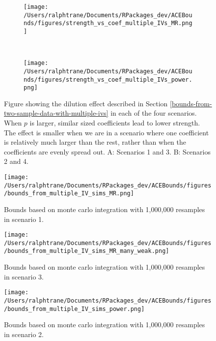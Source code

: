 \documentclass[
]{article}
\theoremstyle{plain}
\begin{document}
\begin{figure*}
  \centering
  \begin{subfigure}{0.5\linewidth}
  \caption{}
  \texttt{[image: /Users/ralphtrane/Documents/RPackages\_dev/ACEBounds/figures/strength\_vs\_coef\_multiple\_IVs\_MR.png]}
  \label{fig:strength_vs_coef_multiple_IVs_MR}
  \end{subfigure}%
  ~
  \begin{subfigure}{0.5\linewidth}
  \caption{}
  \texttt{[image: /Users/ralphtrane/Documents/RPackages\_dev/ACEBounds/figures/strength\_vs\_coef\_multiple\_IVs\_power.png]}
  \label{fig:strength_vs_coef_multiple_IVs_power}
  \end{subfigure}
  \caption{Figure showing the dilution effect described in Section \ref{bounds-from-two-sample-data-with-multiple-ivs} in each of the four scenarios. When $p$ is larger, similar sized coefficients lead to lower strength. The effect is smaller when we are in a scenario where one coefficient is relatively much larger than the rest, rather than when the coefficients are evenly spread out. A: Scenarios 1 and 3. B: Scenarios 2 and 4.}
  \label{fig:strength_vs_coef_multiple_IVs}
\end{figure*}

\clearpage

\begin{sidewaysfigure}
  \centering
  \texttt{[image: /Users/ralphtrane/Documents/RPackages\_dev/ACEBounds/figures/bounds\_from\_multiple\_IV\_sims\_MR.png]}
  \caption{Bounds based on monte carlo integration with 1,000,000 resamples in scenario 1.}
  \label{fig:bounds_from_multiple_IV_sims_MR}
\end{sidewaysfigure}

\clearpage

\begin{sidewaysfigure}
  \centering
  \texttt{[image: /Users/ralphtrane/Documents/RPackages\_dev/ACEBounds/figures/bounds\_from\_multiple\_IV\_sims\_MR\_many\_weak.png]}
  \caption{Bounds based on monte carlo integration with 1,000,000 resamples in scenario 3.}
  \label{fig:bounds_from_multiple_IV_sims_MR_many_weak}
\end{sidewaysfigure}

\clearpage

\begin{sidewaysfigure}
  \centering
  \texttt{[image: /Users/ralphtrane/Documents/RPackages\_dev/ACEBounds/figures/bounds\_from\_multiple\_IV\_sims\_power.png]}
  \caption{Bounds based on monte carlo integration with 1,000,000 resamples in scenario 2.}
  \label{fig:bounds_from_multiple_IV_sims_power}
\end{sidewaysfigure}
\end{document}
